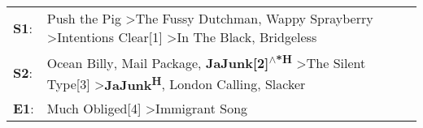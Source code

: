 \begin{supertabular}{p{0.03\textwidth}p{0.92\textwidth}}
 \textbf{S1}:  &                                      Push the Pig\textsuperscript{} \textgreater \enspace The Fussy Dutchman\textsuperscript{}, \enspace Wappy Sprayberry\textsuperscript{} \textgreater \enspace Intentions Clear[1]\textsuperscript{} \textgreater \enspace In The Black\textsuperscript{}, \enspace Bridgeless\textsuperscript{}  \enspace  \\
 \textbf{S2}:  &  Ocean Billy\textsuperscript{}, \enspace Mail Package\textsuperscript{}, \enspace \textbf{JaJunk[2]\textsuperscript{$\wedge$*H}} \textgreater \enspace The Silent Type[3]\textsuperscript{} \textgreater \enspace \textbf{JaJunk\textsuperscript{H}}, \enspace London Calling\textsuperscript{}, \enspace Slacker\textsuperscript{}  \enspace  \\
 \textbf{E1}:  &                                                                                                                                                                                                                                            Much Obliged[4]\textsuperscript{} \textgreater \enspace Immigrant Song\textsuperscript{}  \enspace  \\
\end{supertabular}

